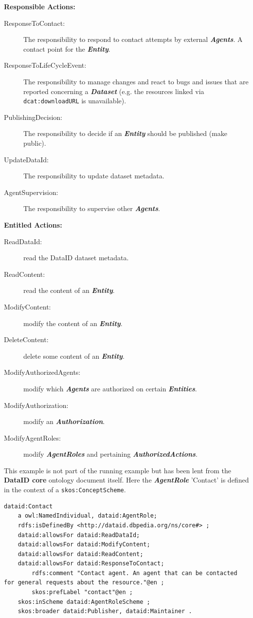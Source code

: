 \documentclass[a4paper,english,twoside,BCOR1.5cm,headsepline,DIV12,appendixprefix,final,12pt]{scrbook}
\newcommand{\core}{{\ttfamily\bfseries DataID core}\xspace}
\newcommand{\prop}[1]{{{\texttt{#1}}}}
\newcommand{\important}[1]{\textbf{\textit{#1}}}
\begin{document}
{\large\textbf{Responsible Actions:}}
\begin{description}
\item[ResponseToContact:] The responsibility to respond to contact attempts by external \important{Agents}. A contact point for the \important{Entity}.
\item[ResponseToLifeCycleEvent:] The responsibility to manage changes and react to bugs and issues that are reported concerning a \important{Dataset} (e.g. the resources linked via \prop{dcat:downloadURL} is unavailable).
\item[PublishingDecision:] The responsibility to decide if an \important{Entity} should be published (make public).
\item[UpdateDataId:] The responsibility to update dataset metadata.
\item[AgentSupervision:] The responsibility to supervise other \important{Agents}.\\
\end{description}

{\large\textbf{Entitled Actions:}}
\begin{description}
\item[ReadDataId:] read the DataID dataset metadata.
\item[ReadContent:] read the content of an \important{Entity}.
\item[ModifyContent:] modify the content of an \important{Entity}.
\item[DeleteContent:] delete some content of an \important{Entity}.
\item[ModifyAuthorizedAgents:] modify which \important{Agents} are authorized on certain \important{Entities}.
\item[ModifyAuthorization:] modify an \important{Authorization}.
\item[ModifyAgentRoles:] modify \important{AgentRoles} and pertaining \important{AuthorizedActions}.
\end{description}

This example is not part of the running example but has been lent from the \core ontology document itself. Here the \important{AgentRole} 'Contact' is defined in the context of a \prop{skos:ConceptScheme}.
\\
\begin{lstlisting}[language=ttl, captionpos=b,caption=Example of an organisation,label=lst:coresuperset,linewidth=\columnwidth,breaklines=true]
dataid:Contact
	a owl:NamedIndividual, dataid:AgentRole;
	rdfs:isDefinedBy <http://dataid.dbpedia.org/ns/core#> ;
	dataid:allowsFor dataid:ReadDataId; 
	dataid:allowsFor dataid:ModifyContent;
	dataid:allowsFor dataid:ReadContent;
	dataid:allowsFor dataid:ResponseToContact;
        rdfs:comment "Contact agent. An agent that can be contacted for general requests about the resource."@en ;
        skos:prefLabel "contact"@en ;
	skos:inScheme dataid:AgentRoleScheme ; 
	skos:broader dataid:Publisher, dataid:Maintainer .   
\end{lstlisting}
\end{document}
